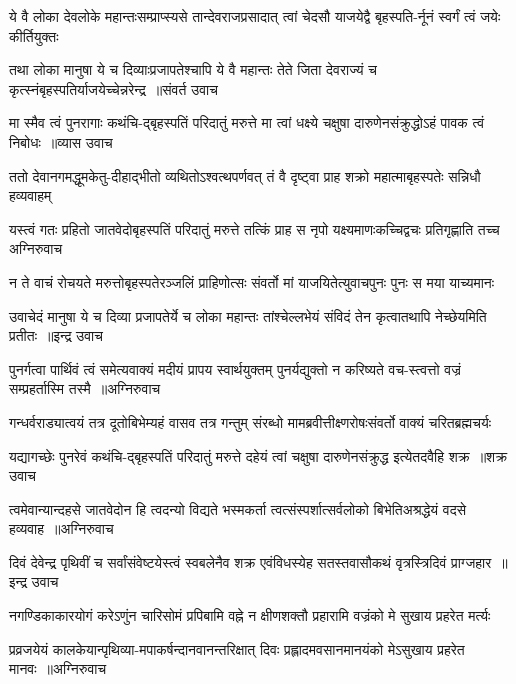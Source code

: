 \twolineshloka
{ये वै लोका देवलोके महान्तःसम्प्राप्स्यसे तान्देवराजप्रसादात्}
{त्वां चेदसौ याजयेद्वै बृहस्पति-र्नूनं स्वर्गं त्वं जयेः कीर्तियुक्तः}


\threelineshloka
{तथा लोका मानुषा ये च दिव्याःप्रजापतेश्चापि ये वै महान्तः}
{तेते जिता देवराज्यं च कृत्स्नंबृहस्पतिर्याजयेच्चेन्नरेन्द्र ॥संवर्त उवाच}
{}


\threelineshloka
{मा स्मैव त्वं पुनरागाः कथंचि-द्बृहस्पतिं परिदातुं मरुत्ते}
{मा त्वां धक्ष्ये चक्षुषा दारुणेनसंक्रुद्धोऽहं पावक त्वं निबोधः ॥व्यास उवाच}
{}


\twolineshloka
{ततो देवानगमद्धूमकेतु-दीहाद्भीतो व्यथितोऽश्वत्थपर्णवत्}
{तं वै दृष्ट्वा प्राह शक्रो महात्माबृहस्पतेः सन्निधौ हव्यवाहम्}


\fourlineindentedshloka
{यस्त्वं गतः प्रहितो जातवेदोबृहस्पतिं परिदातुं मरुत्ते}
{तत्किं प्राह स नृपो यक्ष्यमाणःकच्चिद्वचः प्रतिगृह्णाति तच्च}
{अग्निरुवाच}
{}


\twolineshloka
{न ते वाचं रोचयते मरुत्तोबृहस्पतेरञ्जलिं प्राहिणोत्सः}
{संवर्तो मां याजयितेत्युवाचपुनः पुनः स मया याच्यमानः}


\fourlineindentedshloka
{उवाचेदं मानुषा ये च दिव्या}
{प्रजापतेर्ये च लोका महान्तः}
{तांश्चेल्लभेयं संविदं तेन कृत्वातथापि नेच्छेयमिति प्रतीतः ॥इन्द्र उवाच}
{}


\threelineshloka
{पुनर्गत्वा पार्थिवं त्वं समेत्यवाक्यं मदीयं प्रापय स्वार्थयुक्तम्}
{पुनर्यद्युक्तो न करिष्यते वच-स्त्वत्तो वज्रं सम्प्रहर्तास्मि तस्मै ॥अग्निरुवाच}
{}


\twolineshloka
{गन्धर्वराड्यात्वयं तत्र दूतोबिभेम्यहं वासव तत्र गन्तुम्}
{संरब्धो मामब्रवीत्तीक्ष्णरोषःसंवर्तो वाक्यं चरितब्रह्मचर्यः}


\threelineshloka
{यद्यागच्छेः पुनरेवं कथंचि-द्बृहस्पतिं परिदातुं मरुत्ते}
{दहेयं त्वां चक्षुषा दारुणेनसंक्रुद्ध इत्येतदवैहि शक्र ॥शक्र उवाच}
{}


\threelineshloka
{त्वमेवान्यान्दहसे जातवेदोन हि त्वदन्यो विद्यते भस्मकर्ता}
{त्वत्संस्पर्शात्सर्वलोको बिभेतिअश्रद्धेयं वदसे हव्यवाह ॥अग्निरुवाच}
{}


\threelineshloka
{दिवं देवेन्द्र पृथिवीं च सर्वांसंवेष्टयेस्त्वं स्वबलेनैव शक्र}
{एवंविधस्येह सतस्तवासौकथं वृत्रस्त्रिदिवं प्राग्जहार ॥इन्द्र उवाच}
{}


\twolineshloka
{नगण्डिकाकारयोगं करेऽणुंन चारिसोमं प्रपिबामि वह्ने}
{न क्षीणशक्तौ प्रहारामि वज्रंको मे सुखाय प्रहरेत मर्त्यः}


\threelineshloka
{प्रव्रजयेयं कालकेयान्पृथिव्या-मपाकर्षन्दानवानन्तरिक्षात्}
{दिवः प्रह्लादमवसानमानयंको मेऽसुखाय प्रहरेत मानवः ॥अग्निरुवाच}
{}



